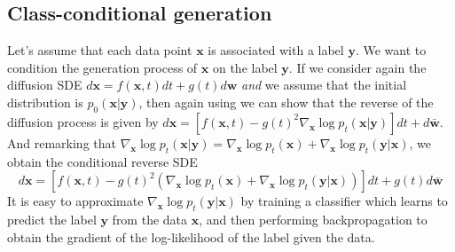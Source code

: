 \documentclass{article}
\begin{document}
\subsection{Class-conditional generation}
Let's assume that each data point $\mathbf{x}$ is associated with a label $\mathbf{y}$. We want to condition the generation process of $\mathbf{x}$ on the label $\mathbf{y}$.
If we consider again the diffusion SDE $d\mathbf{x}=f(\mathbf{x},t)dt+g(t)d\mathbf{w}$ \textit{and} we assume that the initial distribution is $p_0(\mathbf{x}|\mathbf{y})$,
then again using \cite{anderson} we can show that the reverse of the diffusion process is given by $d\mathbf{x}=[f(\mathbf{x},t)-g(t)^2\nabla_\mathbf{x}\log p_t(\mathbf{x}|\mathbf{y})]dt+d\mathbf{\bar{w}}$.
And remarking that $\nabla_\mathbf{x}\log p_t(\mathbf{x}|\mathbf{y})=\nabla_\mathbf{x}\log p_t(\mathbf{x})+\nabla_\mathbf{x}\log p_t(\mathbf{y}|\mathbf{x})$, we obtain the conditional reverse SDE
\begin{equation}
    d\mathbf{x}=[f(\mathbf{x},t)-g(t)^2\left(\nabla_\mathbf{x}\log p_t(\mathbf{x}) + \nabla_\mathbf{x}\log p_t(\mathbf{y}|\mathbf{x}) \right)]dt+g(t)d\mathbf{\bar{w}}
\end{equation}
It is easy to approximate $\nabla_\mathbf{x}\log p_t(\mathbf{y}|\mathbf{x})$ by training a classifier which learns to predict the label $\mathbf{y}$ from the data $\mathbf{x}$, and then performing
backpropagation to obtain the gradient of the log-likelihood of the label given the data.
\end{document}
